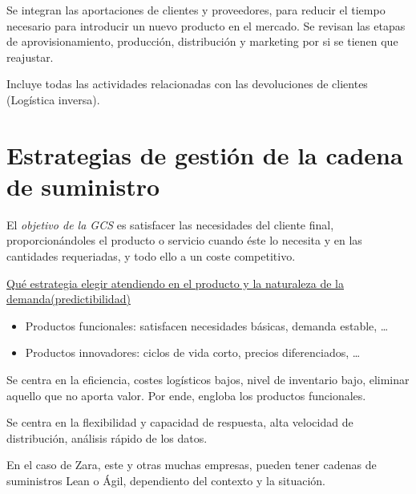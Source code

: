 \documentclass[12pt]{book} %
\providecommand{\tightlist}{%
  \setlength{\itemsep}{0pt}\setlength{\parskip}{0pt}}
\begin{document}
\begin{definicion}
Se integran las aportaciones de clientes y proveedores, para reducir el tiempo necesario para introducir un nuevo producto en el mercado. Se revisan las etapas de aprovisionamiento, producción, distribución y marketing por si se tienen que reajustar.
\end{definicion}

\begin{definicion}[Devoluciones]
Incluye todas las actividades relacionadas con las devoluciones de clientes (Logística inversa).
\end{definicion}

\hypertarget{estrategias-de-gestiuxf3n-de-la-cadena-de-suministro}{%
\section{Estrategias de gestión de la cadena de
suministro}\label{estrategias-de-gestiuxf3n-de-la-cadena-de-suministro}}

El \emph{objetivo de la GCS} es satisfacer las necesidades del cliente
final, proporcionándoles el producto o servicio cuando éste lo necesita
y en las cantidades requeriadas, y todo ello a un coste competitivo.

\underline{Qué estrategia elegir atendiendo en el producto y la naturaleza de la demanda(predictibilidad)}

\begin{itemize}
\tightlist
\item
  Productos funcionales: satisfacen necesidades básicas, demanda
  estable, \ldots{}
\item
  Productos innovadores: ciclos de vida corto, precios diferenciados,
  \ldots{}
\end{itemize}

\begin{definicion}
Se centra en la eficiencia, costes logísticos bajos, nivel de inventario bajo, eliminar aquello que no aporta valor. Por ende, engloba los productos funcionales.
\end{definicion}

\begin{definicion}
Se centra en la flexibilidad y capacidad de respuesta, alta velocidad de distribución, análisis rápido de los datos.
\end{definicion}

En el caso de Zara, este y otras muchas empresas, pueden tener cadenas
de suministros Lean o Ágil, dependiento del contexto y la situación.
\end{document}
